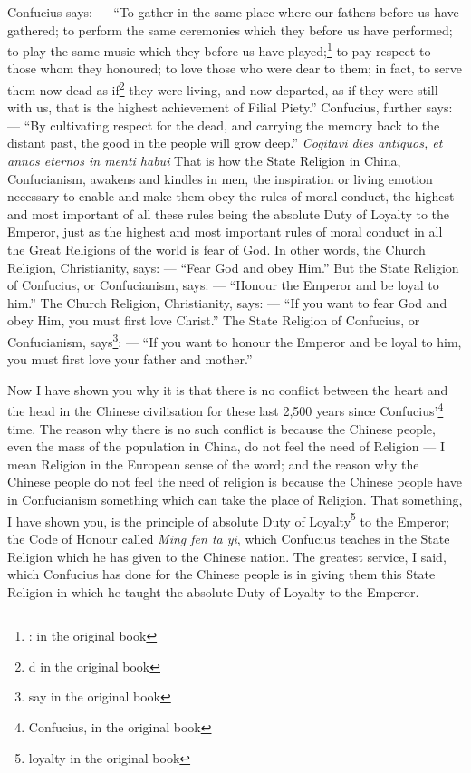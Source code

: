 Confucius says: --- ``To gather in the same place where our fathers before us have gathered; to perform the same ceremonies which they before us have performed; to play the same music which they before us have played;\footnote{: in the original book} to pay respect to those whom they honoured; to love those who were dear to them; in fact, to serve them now dead as if\footnote{d in the original book} they were living, and now departed, as if they were still with us, that is the highest achievement of Filial Piety.''
Confucius, further says: --- ``By cultivating respect for the dead, and carrying the memory back to the distant past, the good in the people will grow deep.''
\emph{Cogitavi dies antiquos, et annos eternos in menti habui}
That is how the State Religion in China, Confucianism, awakens and kindles in men, the inspiration or living emotion necessary to enable and make them obey the rules of moral conduct, the highest and most important of all these rules being the absolute Duty of Loyalty to the Emperor, just as the highest and most important rules of moral conduct in all the Great Religions of the world is fear of God.
In other words, the Church Religion, Christianity, says: --- ``Fear God and obey Him.''
But the State Religion of Confucius, or Confucianism, says: --- ``Honour the Emperor and be loyal to him.''
The Church Religion, Christianity, says: --- ``If you want to fear God and obey Him, you must first love Christ.''
The State Religion of Confucius, or Confucianism, says\footnote{say in the original book}: --- ``If you want to honour the Emperor and be loyal to him, you must first love your father and mother.''

Now I have shown you why it is that there is no conflict between the heart and the head in the Chinese civilisation for these last 2,500 years since Confucius'\footnote{Confucius, in the original book} time.
The reason why there is no such conflict is because the Chinese people, even the mass of the population in China, do not feel the need of Religion --- I mean Religion in the European sense of the word; and the reason why the Chinese people do not feel the need of religion is because the Chinese people have in Confucianism something which can take the place of Religion.
That something, I have shown you, is the principle of absolute Duty of Loyalty\footnote{loyalty in the original book} to the Emperor; the Code of Honour called \emph{Ming fen ta yi}, which Confucius teaches in the State Religion which he has given to the Chinese nation.
The greatest service, I said, which Confucius has done for the Chinese people is in giving them this State Religion in which he taught the absolute Duty of Loyalty to the Emperor.


